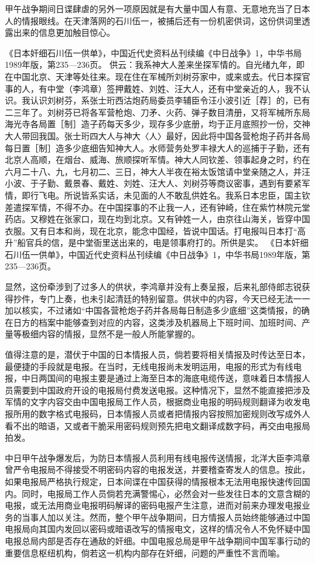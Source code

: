 \documentclass[12pt,UTF8]{ctexbook}
\begin{document}
甲午战争期间日谍肆虐的另外一项原因就是有大量中国人有意、无意地充当了日本人的情报眼线。在天津落网的石川伍一，被捕后还有一份机密供词，这份供词里透露出来的信息更加触目惊心。

《日本奸细石川伍一供单》，中国近代史资料丛刊续编《中日战争》1，中华书局1989年版，第235—236页。
供云：我系神大人差来坐探军情的。自光绪九年，即在中国北京、天津等处往来。现在住在军械所刘树芬家中，或来或去。代日本探官事的人，有中堂（李鸿章）签押戴姓、刘姓、汪大人，还有中堂亲近的人，我不认识。我认识刘树芬，系张士珩西沽炮药局委员李辅臣令汪小波引近［荐］的，已有二三年了。刘树芬已将各军营枪炮、刀矛、火药、弹子数目清册，又将军械所东局海光寺各局置［制］造子药每天多少，现存多少底册，均于正月底照抄一份，交神大人带回我国。张士珩四大人与神大〈人〉最好，因此将中国各营枪炮子药并各局每日置［制］造多少底细告知神大人。水师营务处罗丰禄大人的巡捕于子勤，还有北京人高顺，在烟台、威海、旅顺探听军情。神大人同钦差、领事起身之时，约在六月二十八、九，七月初二、三日，神大人半夜在裕太饭馆请中堂亲随之人，并汪小波、于子勤、戴景春、戴姓、刘姓、汪大人、刘树芬等商议密事，遇到有要紧军情，即行飞电。所说皆系实话，未见面的人不敢乱供姓名。我系日本忠臣，国主钦差遣探军情，不得不办。在中国探事的不止我一人，还有钟崎，住在紫竹林院元堂药店。又穆姓在张家口，现在均到北京。又有钟姓一人，由京往山海关，皆穿中国衣服。又有日本和尚，现在北京，能念中国经，皆说中国话。打电报叫日本打“高升”船官兵的信，是中堂衙里送出来的，电是领事府打的。所供是实。 《日本奸细石川伍一供单》，中国近代史资料丛刊续编《中日战争》1，中华书局1989年版，第235—236页。

显然，这份牵涉到了过多人的供状，李鸿章并没有上奏呈报，后来礼部侍郎志锐获得抄件，专门上奏，也未引起清廷的特别留意。供状中的内容，今天已经无法一一加以核实，不过诸如“中国各营枪炮子药并各局每日制造多少底细”这类情报，的确在日方的档案中能够查到对应的内容，这类涉及机器局上下班时间、加班时间、产量等极细内容的情报，显然不是一般人所能掌握的。

值得注意的是，潜伏于中国的日本情报人员，倘若要将相关情报及时传达至日本，最便捷的手段就是电报。在当时，无线电报尚未发明运用，电报的形式为有线电报，中日两国间的电报主要是通过上海至日本的海底电缆传送，意味着日本情报人员需要到中国政府开设的电报局付费发送电报。这种情况下，显然不能直接把涉及军情的文字内容交由中国电报局工作人员，根据商业电报的明码规则翻译为收发电报所用的数字格式电报码，日本情报人员或者把情报内容按照加密规则改写成外人看不出的暗语，又或者干脆采用密码规则预先把电文翻译成数字码，再交由电报局拍发。

中日甲午战争爆发后，为防日本情报人员利用有线电报传送情报，北洋大臣李鸿章曾严令电报局不得接受不明密码内容的电报发送，并要稽查寄发人的信息。按此，如果电报局严格执行规定，日本间谍在中国获得的情报根本无法用电报快速传回国内。同时，电报局工作人员倘若充满警惕心，必然会对一些发往日本的文意含糊的电报，或无法用商业电报明码解译的密码电报产生注意，进而对前来办理发电报业务的当事人加以关注。然而，整个甲午战争期间，日方情报人员始终能够通过中国电报局向其国内发回以密码或暗语改写的情报电文，这样的情况令人不免怀疑中国电报总局内部是否存在通敌的奸细。中国电报总局是甲午战争期间中国军事行动的重要信息枢纽机构，倘若这一机构内部存在奸细，问题的严重性不言而喻。
\end{document}
